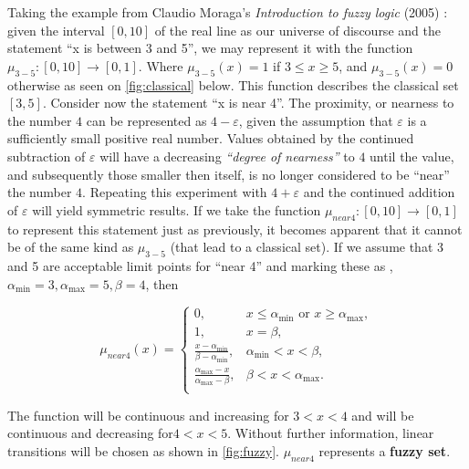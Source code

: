 Taking the example from Claudio Moraga's \textit{Introduction to fuzzy logic} (2005) \cite{moraga2005}: given the interval $[0, 10]$ of the real line as our universe of discourse and the statement ``x is between 3 and 5'', we may represent it with the function $\mu_{3-5}:[0, 10] \to [0,1]$. Where $\mu_{3-5}(x) = 1$ if $3 \leq x \geq 5$, and $\mu_{3-5}(x) = 0$ otherwise as seen on \ref{fig:classical} below. This function describes the classical set $[3, 5]$. Consider now the statement ``x is near 4''. The proximity, or nearness to the number $4$ can be represented as $4-\varepsilon$, given the assumption that $\varepsilon$ is a sufficiently small positive real number. Values obtained by the continued subtraction of $\varepsilon$ will have a decreasing \textit{``degree of nearness''} to $4$ until the value, and subsequently those smaller then itself, is no longer considered to be ``near'' the number $4$. Repeating this experiment with $4+\varepsilon$ and the continued addition of $\varepsilon$ will yield symmetric results. If we take the function $\mu_{near 4} : [0, 10] \to [0, 1]$ to represent this statement just as previously, it becomes apparent that it cannot be of the same kind as $\mu_{3-5}$ (that lead to a classical set). If we assume that 3 and 5 are acceptable limit points for ``near 4” and marking these as , $\alpha_{\min} = 3, \alpha_{\max} = 5, \beta = 4$, then

\[
	\mu_{near 4}(x) =
		\begin{cases}
			0, &x \leq \alpha_{\min} \text{ or } x \geq \alpha_{\max},\\
			1, &x = \beta,\\
			\frac{x - \alpha_{\min}}{\beta - \alpha_{\min}}, &\alpha_{\min} < x < \beta,\\
			\frac{\alpha_{\max} - x}{\alpha_{\max} - \beta}, &\beta < x < \alpha_{\max}.\\
		\end{cases}
\]

The function will be continuous and increasing for $3 < x < 4$ and will be continuous and decreasing for$ 4 < x < 5$. Without further information, linear transitions will be chosen as shown in \ref{fig:fuzzy}. $\mu_{near 4} $ represents a \textbf{fuzzy set}.

